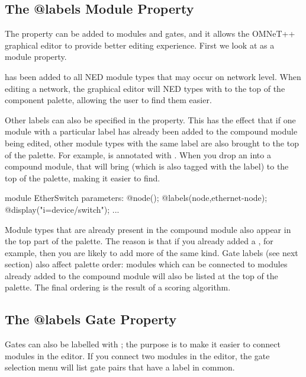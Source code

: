\subsection{The @labels Module Property}

The  property can be added to modules and gates, and it
allows the OMNeT++ graphical editor to provide better editing experience.
First we look at  as a module property.

 has been added to all NED module types that may occur on
network level. When editing a network, the graphical editor will NED types
with  to the top of the component palette, allowing the
user to find them easier.

Other labels can also be specified in the  property. This
has the effect that if one module with a particular label has already been
added to the compound module being edited, other module types with the same
label are also brought to the top of the palette. For example,
 is annotated with .
When you drop an  into a compound module, that will
bring  (which is also tagged with the
 label) to the top of the palette, making it easier to
find.

\begin{ned}
module EtherSwitch
{
    parameters:
        @node();
        @labels(node,ethernet-node);
        @display("i=device/switch");
    ...
}
\end{ned}

Module types that are already present in the compound module also appear in
the top part of the palette. The reason is that if you already added a
, for example, then you are likely to add more of the
same kind. Gate labels (see next section) also affect palette order: modules
which can be connected to modules already added to the compound module
will also be listed at the top of the palette. The final ordering is the
result of a scoring algorithm.


\subsection{The @labels Gate Property}

Gates can also be labelled with ; the purpose is to make it easier
to connect modules in the editor. If you connect two modules in the editor,
the gate selection menu will list gate pairs that have a label in common.

